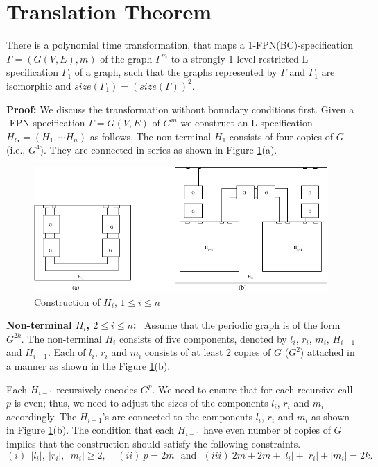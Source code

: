 \section{Translation Theorem}\label{sec:translation}


\begin{theorem}\label{th:translate}
There is a polynomial time transformation, that maps a 
1-FPN(BC)-specification $\Gamma = (G(V,E), m)$ of the  graph $\Gamma^m$ 
to a strongly 1-level-restricted 
L-specification $\Gamma_1$ of a graph, 
such that the graphs represented by 
$\Gamma$ and $\Gamma_1$ are isomorphic and 
$size(\Gamma_1) = (size(\Gamma))^2$.
\end{theorem}

\noindent
{\bf Proof:} We discuss the transformation without boundary conditions first.
Given a {-FPN}-specification  $\Gamma = G(V,E)$ of $G^m$ 
we construct an {\sf L}-specification $H_G = (H_1, \cdots H_n)$ as follows. 
The non-terminal $H_1$  consists of four copies of $G$ (i.e., $G^4$). 
They are connected in series as shown in Figure \ref{translation1.fig}(a). 

\begin{figure}[tbh]
\centering
\includegraphics{translation1}
\caption{Construction of $H_i$, $1 \leq i \leq n$}
\label{translation1.fig}
\end{figure}




\noindent 
{\bf Non-terminal  $H_i$, $2 \leq i \leq n$:}~
Assume that the periodic graph is of the form $G^{2k}$.
The non-terminal $H_i$ consists of five components, denoted by
$l_i$, $r_i$, $m_i$, $H_{i-1}$ and $H_{i-1}$. 
Each of $l_i$, $r_i$ and  $m_i$ consists of at least 2 copies of $G$ 
($G^2$) attached in a manner as shown in the Figure \ref{translation1.fig}(b). 

Each $H_{i-1}$ recursively encodes $G^{p}$. 
We need to ensure that for each recursive
call $p$ is even; thus, we need to adjust the sizes of 
the components $l_i$, $r_i$ and  $m_i$ accordingly.
The $H_{i-1}$'s 
are connected to the components $l_i$, $r_i$ and  $m_i$ as shown in 
Figure \ref{translation1.fig}(b). 
The condition that each $H_{i-1}$ have even number of copies of $G$ 
implies that the construction should satisfy the following constraints.
\[ (i)~~ |l_i|, ~ |r_i|, ~  |m_i| \geq 2,   
~~~~~ (ii)~ p = 2m ~~~\mathrm{and}~~~ (iii)~ 2m + 2m + |l_i| + |r_i| +  |m_i| = 2k.\]  


